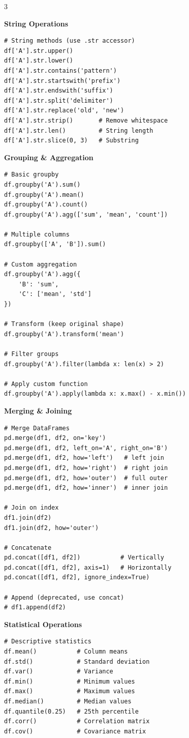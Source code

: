 \documentclass[10pt,landscape,letterpaper]{article}
\newcommand{\sect}[1]{\textbf{\color{blue}#1}}
\begin{document}
\begin{multicols}{3}
\columnbreak

\sect{String Operations}
\begin{lstlisting}
# String methods (use .str accessor)
df['A'].str.upper()
df['A'].str.lower()
df['A'].str.contains('pattern')
df['A'].str.startswith('prefix')
df['A'].str.endswith('suffix')
df['A'].str.split('delimiter')
df['A'].str.replace('old', 'new')
df['A'].str.strip()       # Remove whitespace
df['A'].str.len()         # String length
df['A'].str.slice(0, 3)   # Substring
\end{lstlisting}

\sect{Grouping \& Aggregation}
\begin{lstlisting}
# Basic groupby
df.groupby('A').sum()
df.groupby('A').mean()
df.groupby('A').count()
df.groupby('A').agg(['sum', 'mean', 'count'])

# Multiple columns
df.groupby(['A', 'B']).sum()

# Custom aggregation
df.groupby('A').agg({
    'B': 'sum',
    'C': ['mean', 'std']
})

# Transform (keep original shape)
df.groupby('A').transform('mean')

# Filter groups
df.groupby('A').filter(lambda x: len(x) > 2)

# Apply custom function
df.groupby('A').apply(lambda x: x.max() - x.min())
\end{lstlisting}

\sect{Merging \& Joining}
\begin{lstlisting}
# Merge DataFrames
pd.merge(df1, df2, on='key')
pd.merge(df1, df2, left_on='A', right_on='B')
pd.merge(df1, df2, how='left')   # left join
pd.merge(df1, df2, how='right')  # right join
pd.merge(df1, df2, how='outer')  # full outer
pd.merge(df1, df2, how='inner')  # inner join

# Join on index
df1.join(df2)
df1.join(df2, how='outer')

# Concatenate
pd.concat([df1, df2])           # Vertically
pd.concat([df1, df2], axis=1)   # Horizontally
pd.concat([df1, df2], ignore_index=True)

# Append (deprecated, use concat)
# df1.append(df2)
\end{lstlisting}

\sect{Statistical Operations}
\begin{lstlisting}
# Descriptive statistics
df.mean()           # Column means
df.std()            # Standard deviation
df.var()            # Variance
df.min()            # Minimum values
df.max()            # Maximum values
df.median()         # Median values
df.quantile(0.25)   # 25th percentile
df.corr()           # Correlation matrix
df.cov()            # Covariance matrix


\end{lstlisting}
\end{multicols}
\end{document}
